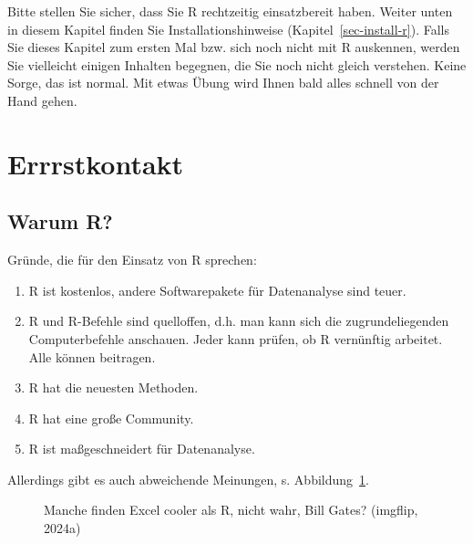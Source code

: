 \documentclass[
  letterpaper,
]{scrbook}
\theoremstyle{definition}
\theoremstyle{definition}
\theoremstyle{definition}
\theoremstyle{remark}
\begin{document}
Bitte stellen Sie sicher, dass Sie R rechtzeitig einsatzbereit haben.
Weiter unten in diesem Kapitel finden Sie Installationshinweise
(Kapitel~\ref{sec-install-r}). Falls Sie dieses Kapitel zum ersten Mal
bzw. sich noch nicht mit R auskennen, werden Sie vielleicht einigen
Inhalten begegnen, die Sie noch nicht gleich verstehen. Keine Sorge, das
ist normal. Mit etwas Übung wird Ihnen bald alles schnell von der Hand
gehen.

\section{Errrstkontakt}\label{errrstkontakt}

\subsection{Warum R?}\label{warum-r}

Gründe, die für den Einsatz von R sprechen:

\begin{enumerate}
\def\labelenumi{\arabic{enumi}.}
\item
  R ist kostenlos, andere Softwarepakete für Datenanalyse sind teuer.
\item
  R und R-Befehle sind quelloffen, d.h. man kann sich die
  zugrundeliegenden Computerbefehle anschauen. Jeder kann prüfen, ob R
  vernünftig arbeitet. Alle können beitragen.
\item
  R hat die neuesten Methoden.
\item
  R hat eine große Community.
\item
  R ist maßgeschneidert für Datenanalyse.
\end{enumerate}

Allerdings gibt es auch abweichende Meinungen, s.
Abbildung~\ref{fig-bill-excel}.

\begin{figure}


\caption{\label{fig-bill-excel}Manche finden Excel cooler als R, nicht
wahr, Bill Gates? (imgflip, 2024a)}

\end{figure}%
\end{document}
